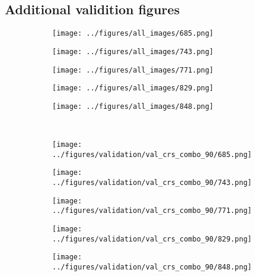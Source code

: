 \subsection{Additional validition figures}
\begin{figure}[h!]
	\begin{subfigure}{0.19\textwidth}
		\centering
		\texttt{[image: ../figures/all\_images/685.png]}
		\label{fig:1}
	\end{subfigure}
	\begin{subfigure}{0.19\textwidth}
		\centering
		\texttt{[image: ../figures/all\_images/743.png]}
		\label{fig:1}
	\end{subfigure}
	\begin{subfigure}{0.19\textwidth}
		\centering
		\texttt{[image: ../figures/all\_images/771.png]}
		\label{fig:1}
	\end{subfigure}
	\begin{subfigure}{0.19\textwidth}
		\centering
		\texttt{[image: ../figures/all\_images/829.png]}
		\label{fig:1}
	\end{subfigure}
	\begin{subfigure}{0.19\textwidth}
		\centering
		\texttt{[image: ../figures/all\_images/848.png]}
		\label{fig:1}
	\end{subfigure}
	\vspace{-0.35cm}
	\\
	\begin{subfigure}{0.19\textwidth}
		\centering
		\texttt{[image: ../figures/validation/val\_crs\_combo\_90/685.png]}
		\label{fig:1}
	\end{subfigure}
	\begin{subfigure}{0.19\textwidth}
		\centering
		\texttt{[image: ../figures/validation/val\_crs\_combo\_90/743.png]}
		\label{fig:1}
	\end{subfigure}
	\begin{subfigure}{0.19\textwidth}
		\centering
		\texttt{[image: ../figures/validation/val\_crs\_combo\_90/771.png]}
		\label{fig:1}
	\end{subfigure}
	\begin{subfigure}{0.19\textwidth}
		\centering
		\texttt{[image: ../figures/validation/val\_crs\_combo\_90/829.png]}
		\label{fig:1}
	\end{subfigure}
	\begin{subfigure}{0.19\textwidth}
		\centering
		\texttt{[image: ../figures/validation/val\_crs\_combo\_90/848.png]}

\end{subfigure}
\end{figure}
